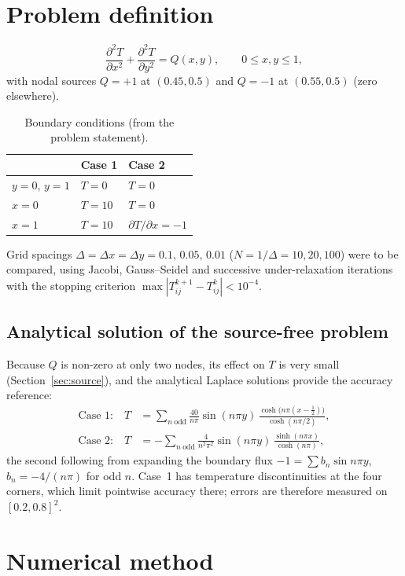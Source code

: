 \section{Problem definition}
\begin{equation}
\frac{\partial^2T}{\partial x^2}+\frac{\partial^2T}{\partial y^2}=Q(x,y),\qquad 0\le x,y\le1, \label{eq:poisson}
\end{equation}
with nodal sources $Q=+1$ at $(0.45,0.5)$ and $Q=-1$ at $(0.55,0.5)$ (zero elsewhere).
\begin{table}[H]\centering\small
\begin{tabular}{lll}\toprule
& Case 1 & Case 2\\\midrule
$y=0$, $y=1$ & $T=0$ & $T=0$\\
$x=0$ & $T=10$ & $T=0$\\
$x=1$ & $T=10$ & $\partial T/\partial x=-1$\\\bottomrule
\end{tabular}\caption{Boundary conditions (from the problem statement).}\end{table}
Grid spacings $\Delta=\Delta x=\Delta y=0.1,\,0.05,\,0.01$ ($N=1/\Delta=10,20,100$) were to be compared, using Jacobi, Gauss--Seidel and successive under-relaxation iterations with the stopping criterion $\max|T^{k+1}_{ij}-T^k_{ij}|<10^{-4}$.

\subsection{Analytical solution of the source-free problem}
Because $Q$ is non-zero at only two nodes, its effect on $T$ is very small (Section~\ref{sec:source}), and the analytical Laplace solutions provide the accuracy reference:
\begin{align}
\text{Case 1:}\quad T&=\sum_{n\ \mathrm{odd}}\frac{40}{n\pi}\sin(n\pi y)\,\frac{\cosh\!\big(n\pi(x-\tfrac12)\big)}{\cosh(n\pi/2)},\\
\text{Case 2:}\quad T&=-\sum_{n\ \mathrm{odd}}\frac{4}{n^2\pi^2}\sin(n\pi y)\,\frac{\sinh(n\pi x)}{\cosh(n\pi)},
\end{align}
the second following from expanding the boundary flux $-1=\sum b_n\sin n\pi y$, $b_n=-4/(n\pi)$ for odd $n$. Case~1 has temperature discontinuities at the four corners, which limit pointwise accuracy there; errors are therefore measured on $[0.2,0.8]^2$.

\section{Numerical method}
